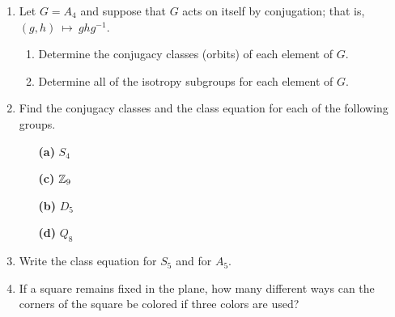 \begin{example}
{\begin{enumerate}
 
\bf\item\rm
Let $G =  A_4$ and suppose that $G$ acts on itself by conjugation;
that is, $(g,h)~\mapsto~ghg^{-1}$. 
\begin{enumerate}
 
 \bf\item\rm
Determine the conjugacy classes (orbits) of each element of $G$.
 
 \bf\item\rm
Determine all of the isotropy subgroups for each element of $G$.
 
\end{enumerate}
 
 
\bf\item\rm
Find the conjugacy classes and the class equation for each of the
following groups. 
 
\vspace{3pt}
 
\hspace{-7pt}
\begin{minipage}[t]{4.6in}
\noindent
\begin{minipage}[t]{2.25in}
\begin{itemize}
 
 \item[{\bf (a)}]
$S_4$
 
 \item[{\bf (c)}]
${\Bbb Z}_9$
 
\end{itemize}
\end{minipage} \hfill
\begin{minipage}[t]{2.25in}
\begin{itemize}
 
 \item[{\bf (b)}]
$D_5$
 
 \item[{\bf (d)}]
$Q_8$
 
\end{itemize}
\end{minipage}
\end{minipage}
 
\vspace{2pt}
 
 
 
\bf\item\rm  %
Write the class equation for $S_5$ and for $A_5$.
 
 
\bf\item\rm
If a square remains fixed in the plane, how many different ways can
the corners of the square be colored if three colors are used?
 

\end{enumerate}}
\end{example}
